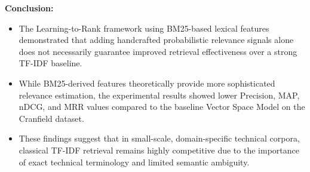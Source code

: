 \documentclass{article}
\begin{document}
\textbf{Conclusion:}
\begin{itemize}
\item The Learning-to-Rank framework using BM25-based lexical features demonstrated that adding handcrafted probabilistic relevance signals alone does not necessarily guarantee improved retrieval effectiveness over a strong TF-IDF baseline.

\item While BM25-derived features theoretically provide more sophisticated relevance estimation, the experimental results showed lower Precision, MAP, nDCG, and MRR values compared to the baseline Vector Space Model on the Cranfield dataset.

\item These findings suggest that in small-scale, domain-specific technical corpora, classical TF-IDF retrieval remains highly competitive due to the importance of exact technical terminology and limited semantic ambiguity.
\end{itemize}
\end{document}
